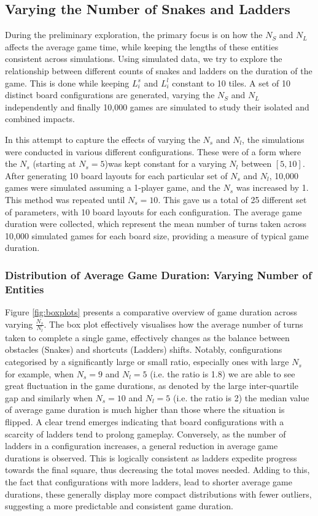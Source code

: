 \subsection{Varying the Number of Snakes and Ladders}

During the preliminary exploration,  the primary focus is on how the $N_S$ and $N_L$ affects the average game time, while keeping the lengths of these entities consistent across simulations. Using simulated data, we try to explore the relationship between different counts of snakes and ladders on the duration of the game. This is done while keeping $L^{s}_{i}$ and $L^{l}_{i}$ constant to 10 tiles. A set of 10 distinct board configurations are generated, varying the $N_S$ and $N_L$ independently and finally 10,000 games are simulated to study their isolated and combined impacts.

In this attempt to capture the effects of varying the $N_s$ and $N_l$, the simulations were conducted in various different configurations. These were of a form where the $N_s$ (starting at $N_s=5$)was kept constant for a varying $N_l$ between $[5, 10]$. After generating 10 board layouts for each particular set of $N_s$ and $N_l$, 10,000 games were simulated assuming a 1-player game, and the $N_s$ was increased by 1. This method was repeated until $N_s=10$. This gave us a total of 25 different set of parameters, with 10 board layouts for each configuration. The average game duration were collected, which represent the mean number of turns taken across 10,000 simulated games for each board size, providing a measure of typical game duration.


\subsubsection{Distribution of Average Game Duration: Varying Number of Entities}

Figure \ref{fig:boxplots} presents a comparative overview of game duration across varying $\frac{N_s}{N_l}$. The box plot effectively visualises how the average number of turns taken to complete a single game, effectively changes as the balance between obstacles (Snakes) and shortcuts (Ladders) shifts. Notably, configurations categorised by a significantly large or small ratio, especially ones with large $N_s$ for example, when $N_s=9$ and $N_l=5$ (i.e. the ratio is 1.8) we are able to see great fluctuation in the game durations, as denoted by the large inter-quartile gap and similarly when $N_s=10$ and $N_l=5$ (i.e. the ratio is 2) the median value of average game duration is much higher than those where the situation is flipped. A clear trend emerges indicating that board configurations with a scarcity of ladders tend to prolong gameplay. Conversely, as the number of ladders in a configuration increases, a general reduction in average game durations is observed. This is logically consistent as ladders expedite progress towards the final square, thus decreasing the total moves needed. Adding to this, the fact that configurations with more ladders, lead to shorter average game durations, these generally display more compact distributions with fewer outliers, suggesting a more predictable and consistent game duration.

